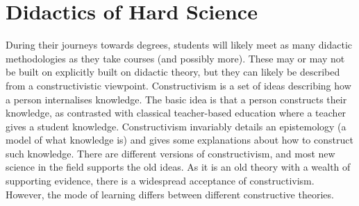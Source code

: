 \section{Didactics of Hard Science}

\iffalse
\textbf{Point of this section}: Present relevant didactic theory.
\textbf{end goal}: Validate project
\fi

During their journeys towards degrees, students will likely meet as many didactic methodologies as they take courses (and possibly more). These may or may not be built on explicitly built on didactic theory, but they can likely be described from a constructivistic viewpoint. 
Constructivism is a set of ideas describing how a person internalises knowledge. The basic idea is that a person constructs their knowledge, as contrasted with classical teacher-based education where a teacher gives a student knowledge.
Constructivism invariably details an epistemology (a model of what knowledge is) and gives some explanations about how to construct such knowledge. There are different versions of constructivism, and most new science in the field supports the old ideas. As it is an old theory with a wealth of supporting evidence, there is a widespread acceptance of constructivism. However, the mode of learning differs between different constructive theories. \cite[p.51-53]{imsen_2005}


